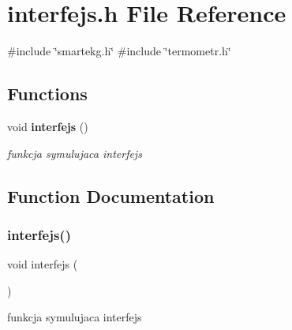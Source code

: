 \section{interfejs.\+h File Reference}
\label{interfejs_8h}
{\ttfamily \#include \char`\"{}smartekg.\+h\char`\"{}}\newline
{\ttfamily \#include \char`\"{}termometr.\+h\char`\"{}}\newline
\subsection*{Functions}
\begin{DoxyCompactItemize}
\item 
void \textbf{ interfejs} ()
\begin{DoxyCompactList}\small\item\em funkcja symulujaca interfejs \end{DoxyCompactList}\end{DoxyCompactItemize}


\subsection{Function Documentation}
\mbox{\label{interfejs_8h_a3105c716b75322c6bbec3dfa0a457125}} 
\subsubsection{interfejs()}
{\footnotesize\ttfamily void interfejs (\begin{DoxyParamCaption}{ }\end{DoxyParamCaption})}



funkcja symulujaca interfejs 

